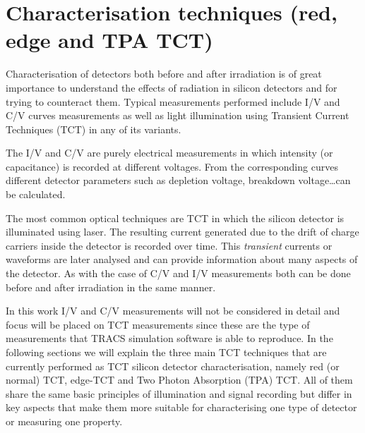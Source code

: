 \chapter{Characterisation techniques (red, edge and TPA TCT)}
\label{chap:TCT}

Characterisation of detectors both before and after irradiation is of great importance to understand the effects of radiation in silicon detectors and for trying to counteract them. Typical measurements performed include I/V and C/V curves measurements as well as light illumination using Transient Current Techniques (TCT) in any of its variants. 


The I/V and C/V are purely electrical measurements in which intensity (or capacitance) is recorded at different voltages. From the corresponding curves different detector parameters such as depletion voltage, breakdown voltage\ldots can be calculated. 

The most common optical techniques are TCT in which the silicon detector is illuminated using laser. The resulting current generated due to the drift of charge carriers inside the detector is recorded over time. This \textit{transient} currents or waveforms are later analysed and can provide information about many aspects of the detector. As with the case of C/V and I/V measurements both can be done before and after irradiation in the same manner.

In this work I/V and C/V measurements will not be considered in detail and focus will be placed on TCT measurements since these are the type of measurements that TRACS simulation software is able to reproduce. In the following sections we will explain the three main TCT techniques that are currently performed as TCT silicon detector characterisation, namely red (or normal) TCT, edge-TCT and Two Photon Absorption (TPA) TCT. All of them share the same basic principles of illumination and signal recording but differ in key aspects that make them more suitable for characterising one type of detector or measuring one property. 

